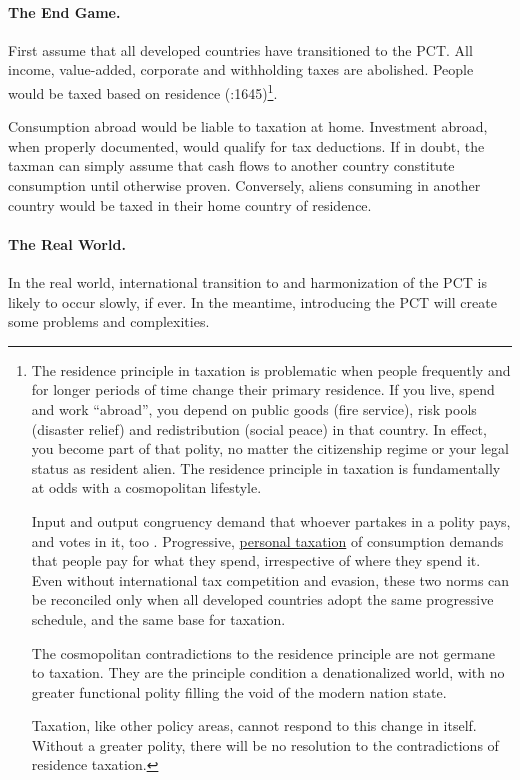 \paragraph{The End Game.} First assume that all developed countries have transitioned to the PCT. All income, value-added, corporate and withholding taxes are abolished. People would be taxed based on residence (\citealt{Graetz2009}:1645)\footnote{
	The residence principle in taxation is problematic when people frequently and for longer periods of time change their primary residence. If you live, spend and work ``abroad'', you depend on public goods (fire service), risk pools (disaster relief) and redistribution (social peace) in that country. In effect, you become part of that polity, no matter the citizenship regime or your legal status as resident alien. The residence principle in taxation is fundamentally at odds with a cosmopolitan lifestyle. 

	Input and output congruency demand that whoever partakes in a polity pays, and votes in it, too \citep{Zurn-2000-aa}. Progressive, \hyperref[des:PersonalTaxation]{personal taxation} of consumption demands that people pay for what they spend, irrespective of where they spend it. Even without international tax competition and evasion, these two norms can be reconciled only when all developed countries adopt the same progressive schedule, and the same base for taxation.

	The cosmopolitan contradictions to the residence principle are not germane to taxation. They are the principle condition a denationalized world, with no greater functional polity filling the void of the modern nation state. 

	Taxation, like other policy areas, cannot respond to this change in itself. Without a greater polity, there will be no resolution to the contradictions of residence taxation.}.

Consumption abroad would be liable to taxation at home. Investment abroad, when properly documented, would qualify for tax deductions. If in doubt, the taxman can simply assume that cash flows to another country constitute consumption until otherwise proven. Conversely, aliens consuming in another country would be taxed in their home country of residence.

\paragraph{The Real World.} In the real world, international transition to and harmonization of the PCT is likely to occur slowly, if ever. In the meantime, introducing the PCT will create some problems and complexities.

